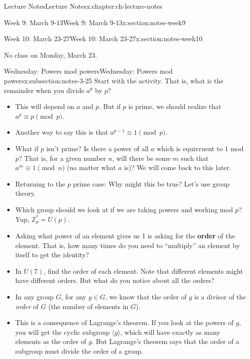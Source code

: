 \documentclass[oneside,11pt,]{book}
\newcommand{\terminology}[1]{\textbf{#1}}
\newcommand{\Z}{\mathbb{Z}}
\begin{document}
\begin{chapterptx}{Lecture Notes}{}{Lecture Notes}{}{}{x:chapter:ch-lecture-notes}
\begin{sectionptx}{Week 9: March 9-13}{}{Week 9: March 9-13}{}{}{x:section:notes-week9}
\end{sectionptx}
%
%
\typeout{************************************************}
\typeout{************************************************}
%
\begin{sectionptx}{Week 10: March 23-27}{}{Week 10: March 23-27}{}{}{x:section:notes-week10}
\begin{introduction}{}%
No class on Monday, March 23.%
\end{introduction}%
%
%
\typeout{************************************************}
\typeout{************************************************}
%
\begin{subsectionptx}{Wednesday: Powers mod powers}{}{Wednesday: Powers mod powers}{}{}{x:subsection:notes-3-25}
Start with the activity. That is, what is the remainder when you divide \(a^p\) by \(p\)?%
\begin{itemize}[label=\textbullet]
\item{}This will depend on \(a\) and \(p\).  But if \(p\) is prime, we should realize that \(a^p \equiv p \pmod{p}\).%
\item{}Another way to say this is that \(a^{p-1} \equiv 1 \pmod{p}\).%
\item{}What if \(p\) isn't prime?  Is there a power of all \(a\) which is equivruent to 1 mod \(p\)?  That is, for a given number \(n\), will there be some \(m\) such that \(a^m \equiv 1 \pmod{n}\) (no matter what \(a\) is)?  We will come back to this later.%
\item{}Returning to the \(p\) prime case: Why might this be true?  Let's use group theory.%
\item{}Which group should we look at if we are taking powers and working mod \(p\)?  Yup, \(\Z_p^* = U(p)\).%
\item{}Asking what power of an element gives us 1 is asking for the \terminology{order} of the element.  That is, how many times do you need to ``multiply'' an element by itself to get the identity?%
\item{}In \(U(7)\), find the order of each element.  Note that different elements might have different orders.  But what do you notice about all the orders?%
\item{}In any group \(G\), for any \(g \in G\), we know that the order of \(g\) is a divisor of the \emph{order} of \(G\) (the number of elements in \(G\)).%
\item{}This is a consequence of Lagrange's theorem. If you look at the powers of \(g\), you will get the cyclic subgroup \(\langle g \rangle\), which will have exactly as many elements as the order of \(g\).  But Lagrange's theorem says that the order of a subgroup must divide the order of a group.%

\end{itemize}
\end{subsectionptx}
\end{sectionptx}
\end{chapterptx}
\end{document}
